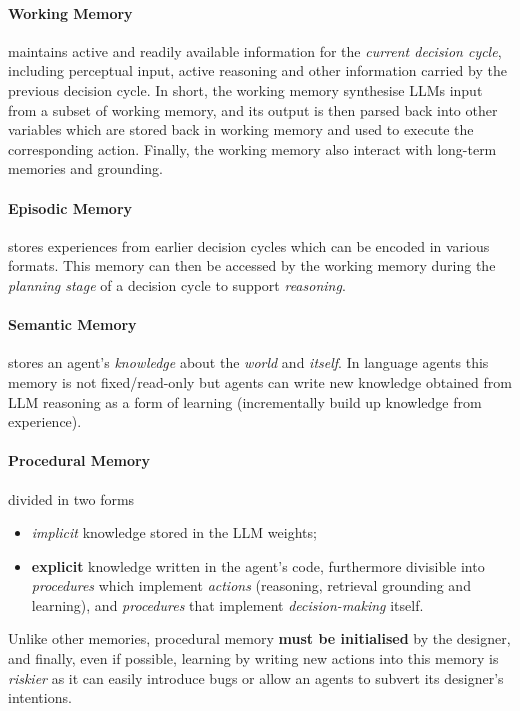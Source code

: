 \paragraph{Working Memory} maintains active and readily available information
for the \emph {current decision cycle}, including perceptual input, active
reasoning and other information carried by the previous decision cycle. In
short, the working memory synthesise \ac{LLM}s input from a subset of working
memory, and its output is then parsed back into other variables which are
stored back in working memory and used to execute the corresponding action.
Finally, the working memory also interact with long-term memories and
grounding.

\paragraph{Episodic Memory} stores experiences from earlier decision cycles
which can be encoded in various formats. This memory can then be accessed by
the working memory during the \emph{planning stage} of a decision cycle to
support \emph{reasoning}.

\paragraph{Semantic Memory} stores an agent's \emph{knowledge} about the
\emph{world} and \emph{itself}. In language agents this memory is not
fixed/read-only but agents can write new knowledge obtained from \ac{LLM}
reasoning as a form of learning (incrementally build up knowledge from
experience).

\paragraph{Procedural Memory} divided in two forms

\begin{itemize}
    \item \emph{implicit} knowledge stored in the \ac{LLM} weights;
    \item \textbf{explicit} knowledge written in the agent's code, furthermore
        divisible into \emph{procedures} which implement \emph{actions} (reasoning,
        retrieval grounding and learning), and \emph{procedures} that implement \emph{decision-making} itself.
\end{itemize}

Unlike other memories, procedural memory \textbf{must be initialised} by the
designer, and finally, even if possible, learning by writing new actions into
this memory is \emph{riskier} as it can easily introduce bugs or allow an
agents to subvert its designer's intentions.

